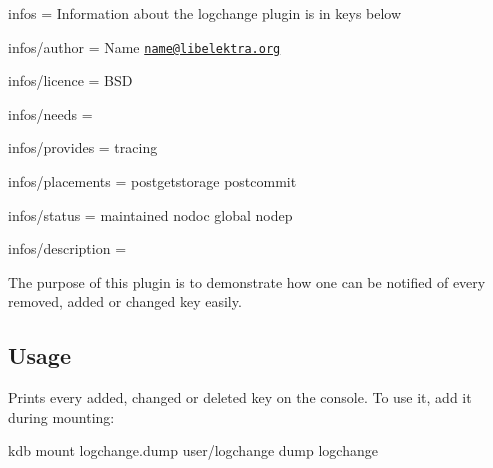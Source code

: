 
\begin{DoxyItemize}
\item infos = Information about the logchange plugin is in keys below
\item infos/author = Name \href{mailto:name@libelektra.org}{\tt name@libelektra.\+org}
\item infos/licence = B\+S\+D
\item infos/needs =
\item infos/provides = tracing
\item infos/placements = postgetstorage postcommit
\item infos/status = maintained nodoc global nodep
\item infos/description =
\end{DoxyItemize}

The purpose of this plugin is to demonstrate how one can be notified of every removed, added or changed key easily.

\subsection*{Usage}

Prints every added, changed or deleted key on the console. To use it, add it during mounting\+: \begin{DoxyVerb}kdb mount logchange.dump user/logchange dump logchange\end{DoxyVerb}
 